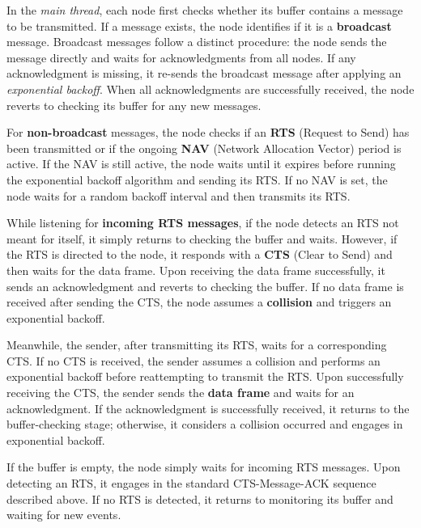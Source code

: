 \documentclass[a4paper,12pt]{article}
\begin{document}
In the \textit{main thread}, each node first checks whether its buffer contains a message to be transmitted. If a message exists, the node identifies if it is a \textbf{broadcast} message. Broadcast messages follow a distinct procedure: the node sends the message directly and waits for acknowledgments from all nodes. If any acknowledgment is missing, it re-sends the broadcast message after applying an \textit{exponential backoff}. When all acknowledgments are successfully received, the node reverts to checking its buffer for any new messages.

For \textbf{non-broadcast} messages, the node checks if an \textbf{RTS} (Request to Send) has been transmitted or if the ongoing \textbf{NAV} (Network Allocation Vector) period is active. If the NAV is still active, the node waits until it expires before running the exponential backoff algorithm and sending its RTS. If no NAV is set, the node waits for a random backoff interval and then transmits its RTS.

While listening for \textbf{incoming RTS messages}, if the node detects an RTS not meant for itself, it simply returns to checking the buffer and waits. However, if the RTS is directed to the node, it responds with a \textbf{CTS} (Clear to Send) and then waits for the data frame. Upon receiving the data frame successfully, it sends an acknowledgment and reverts to checking the buffer. If no data frame is received after sending the CTS, the node assumes a \textbf{collision} and triggers an exponential backoff.

Meanwhile, the sender, after transmitting its RTS, waits for a corresponding CTS. If no CTS is received, the sender assumes a collision and performs an exponential backoff before reattempting to transmit the RTS. Upon successfully receiving the CTS, the sender sends the \textbf{data frame} and waits for an acknowledgment. If the acknowledgment is successfully received, it returns to the buffer-checking stage; otherwise, it considers a collision occurred and engages in exponential backoff.

If the buffer is empty, the node simply waits for incoming RTS messages. Upon detecting an RTS, it engages in the standard \textsf{CTS-Message-ACK} sequence described above. If no RTS is detected, it returns to monitoring its buffer and waiting for new events.
\end{document}
